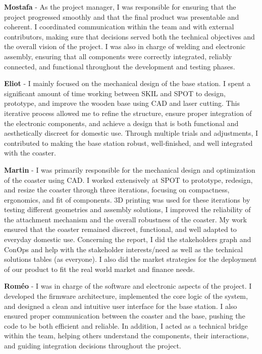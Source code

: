 \documentclass{article}
\begin{document}
\textbf{Mostafa} - As the project manager, I was responsible for ensuring that the project progressed smoothly and that the final product was presentable and coherent. I coordinated communication within the team and with external contributors, making sure that decisions served both the technical objectives and the overall vision of the project. I was also in charge of welding and electronic assembly, ensuring that all components were correctly integrated, reliably connected, and functional throughout the development and testing phases.\vspace{0.2cm}

\textbf{Eliot} - I mainly focused on the mechanical design of the base station. I spent a significant amount of time working between SKIL and SPOT to design, prototype, and improve the wooden base using CAD and laser cutting. This iterative process allowed me to refine the structure, ensure proper integration of the electronic components, and achieve a design that is both functional and aesthetically discreet for domestic use. Through multiple trials and adjustments, I contributed to making the base station robust, well-finished, and well integrated with the coaster.\vspace{0.2cm}

\textbf{Martin} - I was primarily responsible for the mechanical design and optimization of the coaster using CAD. I worked extensively at SPOT to prototype, redesign, and resize the coaster through three iterations, focusing on compactness, ergonomics, and fit of components. 3D printing was used for these iterations by testing different geometries and assembly solutions, I improved the reliability of the attachment mechanism and the overall robustness of the coaster. My work ensured that the coaster remained discreet, functional, and well adapted to everyday domestic use. Concerning the report, I did the stakeholders graph and ConOps and help with the stakeholder interests/need as well as the technical solutions tables (as everyone). I also did the market strategies for the deployment of our product to fit the real world market and finance needs.\vspace{0.2cm}

\textbf{Roméo} - I was in charge of the software and electronic aspects of the project. I developed the firmware architecture, implemented the core logic of the system, and designed a clean and intuitive user interface for the base station. I also ensured proper communication between the coaster and the base, pushing the code to be both efficient and reliable. In addition, I acted as a technical bridge within the team, helping others understand the components, their interactions, and guiding integration decisions throughout the project.
\end{document}
